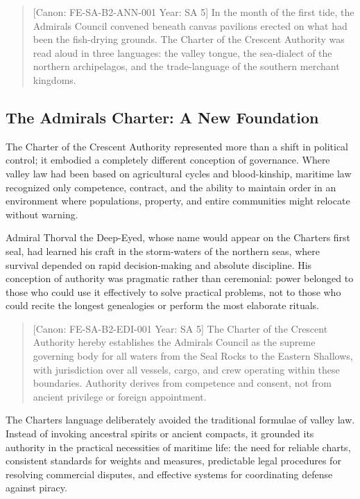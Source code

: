 \begin{quote}
{[}Canon: FE-SA-B2-ANN-001 \textbar{} Year: SA 5{]} In the month of the
first tide, the Admiral\textquotesingle s Council convened beneath
canvas pavilions erected on what had been the fish-drying grounds. The
Charter of the Crescent Authority was read aloud in three languages: the
valley tongue, the sea-dialect of the northern archipelagos, and the
trade-language of the southern merchant kingdoms.
\end{quote}

\subsection{The Admiral\textquotesingle s Charter: A New
Foundation}\label{the-admirals-charter-a-new-foundation}

The Charter of the Crescent Authority represented more than a shift in
political control; it embodied a completely different conception of
governance. Where valley law had been based on agricultural cycles and
blood-kinship, maritime law recognized only competence, contract, and
the ability to maintain order in an environment where populations,
property, and entire communities might relocate without warning.

Admiral Thorval the Deep-Eyed, whose name would appear on the
Charter\textquotesingle s first seal, had learned his craft in the
storm-waters of the northern seas, where survival depended on rapid
decision-making and absolute discipline. His conception of authority was
pragmatic rather than ceremonial: power belonged to those who could use
it effectively to solve practical problems, not to those who could
recite the longest genealogies or perform the most elaborate rituals.

\begin{quote}
{[}Canon: FE-SA-B2-EDI-001 \textbar{} Year: SA 5{]} The Charter of the
Crescent Authority hereby establishes the Admiral\textquotesingle s
Council as the supreme governing body for all waters from the Seal Rocks
to the Eastern Shallows, with jurisdiction over all vessels, cargo, and
crew operating within these boundaries. Authority derives from
competence and consent, not from ancient privilege or foreign
appointment.
\end{quote}

The Charter\textquotesingle s language deliberately avoided the
traditional formulae of valley law. Instead of invoking ancestral
spirits or ancient compacts, it grounded its authority in the practical
necessities of maritime life: the need for reliable charts, consistent
standards for weights and measures, predictable legal procedures for
resolving commercial disputes, and effective systems for coordinating
defense against piracy.

